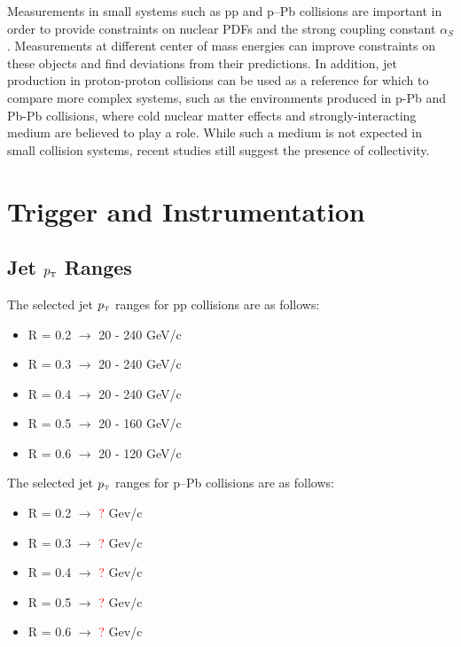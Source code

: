\documentclass[ALICE]{ALICE_analysis_notes}
\newcommand{\pT}{$p_{\mbox{\tiny T}}$\xspace}
\newcommand{\pPb}{{\mbox{p--Pb}}\xspace}
\newcommand{\pp}{pp\xspace}
\begin{document}
Measurements in small systems such as pp and p--Pb collisions are important in order to provide constraints on nuclear PDFs and the strong coupling constant $\alpha_{S}$ \cite{CMSPDFConstraints}. Measurements at different center of mass energies can improve constraints on these objects and find deviations from their predictions. In addition, jet production in proton-proton collisions can be used as a reference for which to compare more complex systems, such as the environments produced in p-Pb and Pb-Pb collisions, where cold nuclear matter effects and strongly-interacting medium are believed to play a role. While such a medium is not expected in small collision systems, recent studies still suggest the presence of collectivity.\clearpage{}
\clearpage{}\section{Trigger and Instrumentation}
\label{chap:TriggerAndInstrumentation}

\subsection{Jet \pT Ranges}
\label{sec:ptRanges}

The selected jet \pT ranges for \pp collisions are as follows:

\begin{itemize}
    \item R = 0.2 $\rightarrow$ 20 - 240 GeV/c
    \item R = 0.3 $\rightarrow$ 20 - 240 GeV/c
    \item R = 0.4 $\rightarrow$ 20 - 240 GeV/c
    \item R = 0.5 $\rightarrow$ 20 - 160 GeV/c
    \item R = 0.6 $\rightarrow$ 20 - 120 GeV/c
\end{itemize}

The selected jet \pT ranges for \pPb collisions are as follows:

\begin{itemize}
    \item R = 0.2 $\rightarrow$ \textcolor{red}{?} Gev/c
    \item R = 0.3 $\rightarrow$ \textcolor{red}{?} Gev/c
    \item R = 0.4 $\rightarrow$ \textcolor{red}{?} Gev/c
    \item R = 0.5 $\rightarrow$ \textcolor{red}{?} Gev/c
    \item R = 0.6 $\rightarrow$ \textcolor{red}{?} Gev/c
\end{itemize}
\end{document}
